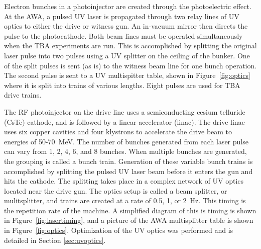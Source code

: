 Electron bunches in a photoinjector are created through the photoelectric effect. 
At the AWA, a pulsed UV laser is propagated through two relay lines of UV optics to either
the drive or witness gun. An in-vacuum mirror then directs the pulse to the photocathode.
Both beam lines must be operated simultaneously when the TBA experiments are run. This is accomplished by
splitting the original laser pulse into two pulses using a UV splitter on the 
ceiling of the bunker. One of the split pulses is sent (as is) to the witness beam line for one
bunch operation. The second pulse is sent to a UV multispitter table, shown in 
Figure~\ref{fig:optics} where it is split into trains of various lengths. Eight pulses are 
used for TBA drive trains.

The RF photoinjector on the drive line uses a semiconducting
cesium telluride (CsTe) cathode, and is followed by a linear accelerator (linac). The
drive linac uses six copper cavities and four klystrons to accelerate the drive beam
to energies of 50-\SI{70}{MeV}. The number of bunches generated from each 
laser pulse can vary from 1, 2, 4, 6, and 8 bunches. When multiple bunches
are generated, the grouping is called a bunch train. Generation of
these variable bunch trains is accomplished by splitting the pulsed
UV laser beam before it enters the gun and hits the cathode. The splitting
takes place in a complex network of UV optics located near the drive
gun. The optics setup is called a beam splitter, or mulitsplitter,
and trains are created at a rate of 0.5, 1, or \SI{2}{Hz}. 
This timing is the repetition rate of the machine. 
A simplified diagram of this is timing is shown in Figure~\ref{fig:lasertiming}, 
and a picture of the AWA multisplitter table is shown in Figure~\ref{fig:optics}. 
Optimization of the UV optics was performed and is detailed in Section \ref{sec:uvoptics}.  
